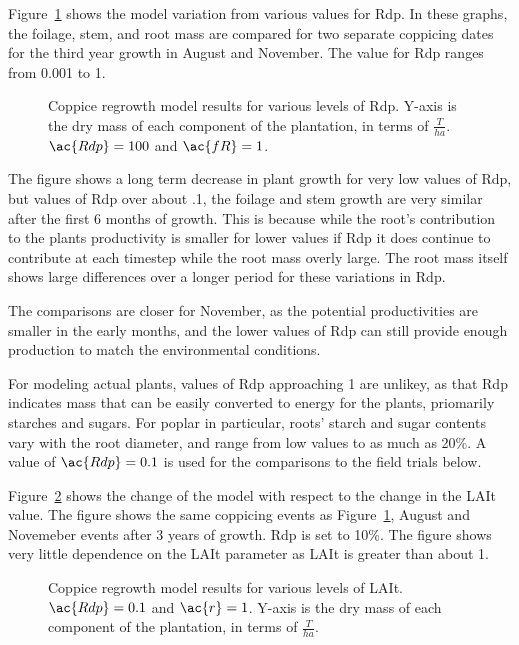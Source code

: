 \documentclass[10pt]{article}
\begin{document}
Figure~\ref{fig:rdp} shows the model variation from various values for
\acf{Rdp}.  In these graphs, the foilage, stem, and root mass are
compared for two separate coppicing dates for the third year growth in
August and November.  The value for \ac{Rdp} ranges from 0.001 to 1.

\begin{figure}
  \centering
  
  \caption{Coppice regrowth model results for various levels of \acf{Rdp}.
    Y-axis is the dry mass of each component of the plantation, in
    terms of $\frac{T}{ha}$. $\ac{Rdp}=100$ and $\ac{fR}=1$.}
  \label{fig:rdp}
\end{figure}

The figure shows a long term decrease in plant growth for very low
values of \ac{Rdp}, but values of \ac{Rdp} over about .1, the foilage
and stem growth are very similar after the first 6 months of growth.
This is because while the root's contribution to the plants
productivity is smaller for lower values if \ac{Rdp} it does continue
to contribute at each timestep while the root mass overly large. The
root mass itself shows large differences over a longer period for
these variations in \ac{Rdp}.  

The comparisons are closer for November, as the potential
productivities are smaller in the early months, and the lower values
of \ac{Rdp} can still provide enough production to match the
environmental conditions.

For modeling actual plants, values of \ac{Rdp} approaching 1 are
unlikey, as that \ac{Rdp} indicates mass that can be easily converted
to energy for the plants, priomarily starches and sugars.  For poplar
in particular, roots' starch and sugar contents vary with the root
diameter, and range from low values to as much as 20\%.  A value of
$\ac{Rdp}=0.1$ is used for the comparisons to the field trials below. 

Figure~\ref{fig:lai} shows the change of the model with respect to the
change in the \ac{LAIt} value.  The figure shows the same coppicing
events as Figure~\ref{fig:rdp}, August and Novemeber events after 3
years of growth.  \ac{Rdp} is set to 10\%.  The figure shows very
little dependence on the \ac{LAIt} parameter as \ac{LAIt} is greater
than about 1.

\begin{figure}
  \centering
  
  \caption{Coppice regrowth model results for various levels of
    \acf{LAIt}.  $\ac{Rdp} = 0.1$ and $\ac{r}=1$.  Y-axis is the dry
    mass of each component of the plantation, in terms of
    $\frac{T}{ha}$.}
  \label{fig:lai}
\end{figure}
\end{document}
